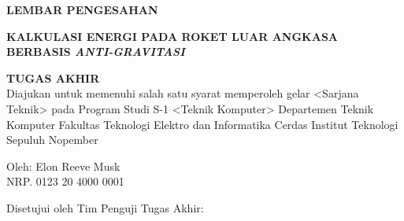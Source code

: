 \begin{center}
	\large
  \textbf{LEMBAR PENGESAHAN}
\end{center}

\thispagestyle{empty}

\begin{center}
  \textbf{KALKULASI ENERGI PADA ROKET LUAR ANGKASA BERBASIS \emph{ANTI-GRAVITASI}}
\end{center}

\begingroup
  \small
  

  \begin{center}
    \textbf{TUGAS AKHIR}
    \\Diajukan untuk memenuhi salah satu syarat memperoleh gelar <Sarjana Teknik> pada Program Studi S-1 <Teknik Komputer> Departemen Teknik Komputer Fakultas Teknologi Elektro dan Informatika Cerdas Institut Teknologi Sepuluh Nopember
  \end{center}


  \begin{center}
    Oleh: Elon Reeve Musk 
    \\NRP. 0123 20 4000 0001
  \end{center}



  \begin{center}
    Disetujui oleh Tim Penguji Tugas Akhir:
  \end{center}


  \begingroup
    \setlength{\tabcolsep}{0pt}

